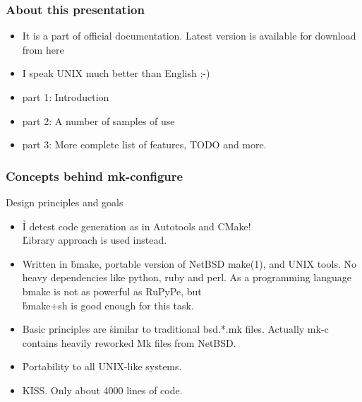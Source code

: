 \documentclass[hyperref={colorlinks=true}]{beamer}
\begin{document}
\begin{frame}
  \frametitle{About this presentation}
  \begin{block}{}
    \begin{itemize}
    \item It is a part of official documentation.
      Latest version is available for download from here\\
    \item I speak UNIX much better than English ;-)
    \item part 1: Introduction
    \item part 2: A number of samples of use
    \item part 3: More complete list of features, TODO and more.
    \end{itemize}
  \end{block}
\end{frame}

\begin{frame}
  \frametitle{Concepts behind mk-configure}
  \begin{block}{Design principles and goals}
    \begin{itemize}
    \item \h{I detest code generation} as in Autotools and CMake!\\
      \h{Library approach} is used instead.
    \item Written in \h{bmake}, portable version of \h{NetBSD make(1)},
      and UNIX tools. \h{No heavy dependencies} like python, ruby and perl.
      As a programming language
      bmake is not as powerful as RuPyPe, but\\
      \h{\mbox{bmake+sh} is good enough} for this task.
    \item Basic principles are \h{similar to
      traditional \mbox{bsd.*.mk} files}.
      Actually mk-c contains heavily reworked Mk files from NetBSD.
    \item \h{Portability} to all UNIX-like systems.
    \item KISS.  Only about 4000 lines of code.
    \end{itemize}
  \end{block}
\end{frame}
\end{document}
